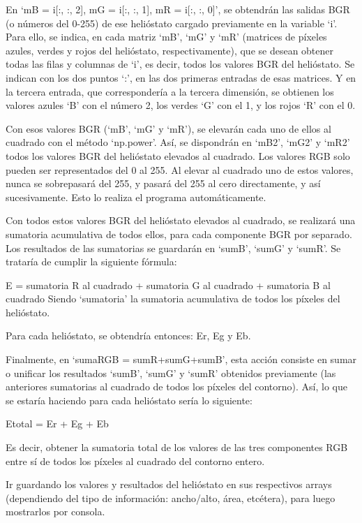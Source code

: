 \documentclass[12pt]{article}
\begin{document}
En ‘mB = i[:, :, 2], mG = i[:, :, 1], mR = i[:, :, 0]’, se obtendrán las salidas BGR (o números del 0-255) de ese helióstato cargado previamente en la variable ‘i’. Para ello, se indica, en cada matriz ‘mB’, ‘mG’ y ‘mR’ (matrices de píxeles azules, verdes y rojos del helióstato, respectivamente), que se desean obtener todas las filas y columnas de ‘i’, es decir, todos los valores BGR del helióstato. Se indican con los dos puntos ‘:’, en las dos primeras entradas de esas matrices. Y en la tercera entrada, que correspondería a la tercera dimensión, se obtienen los valores azules ‘B’ con el número 2, los verdes ‘G’ con el 1, y los rojos ‘R’ con el 0.

Con esos valores BGR (‘mB’, ‘mG’ y ‘mR’), se elevarán cada uno de ellos al cuadrado con el método ‘np.power’. Así, se dispondrán en ‘mB2’, ‘mG2’ y ‘mR2’ todos los valores BGR del helióstato elevados al cuadrado. Los valores RGB solo pueden ser representados del 0 al 255. Al elevar al cuadrado uno de estos valores, nunca se sobrepasará del 255, y pasará del 255 al cero directamente, y así sucesivamente. Esto lo realiza el programa automáticamente.

Con todos estos valores BGR del helióstato elevados al cuadrado, se realizará una sumatoria acumulativa de todos ellos, para cada componente BGR por separado. Los resultados de las sumatorias se guardarán en ‘sumB’, ‘sumG’ y ‘sumR’. Se trataría de cumplir la siguiente fórmula:

E = sumatoria R al cuadrado + sumatoria G al cuadrado + sumatoria B al cuadrado
Siendo ‘sumatoria’ la sumatoria acumulativa de todos los píxeles del helióstato.

Para cada helióstato, se obtendría entonces: Er, Eg y Eb.
           
Finalmente, en ‘sumaRGB = sumR+sumG+sumB’, esta acción consiste en sumar o unificar los resultados ‘sumB’, ‘sumG’ y ‘sumR’ obtenidos previamente (las anteriores sumatorias al cuadrado de todos los píxeles del contorno). Así, lo que se estaría haciendo para cada helióstato sería lo siguiente:

Etotal = Er + Eg + Eb

Es decir, obtener la sumatoria total de los valores de las tres componentes RGB entre sí de todos los píxeles al cuadrado del contorno entero.

Ir guardando los valores y resultados del helióstato en sus respectivos arrays (dependiendo del tipo de información: ancho/alto, área, etcétera), para luego mostrarlos por consola.
\end{document}
